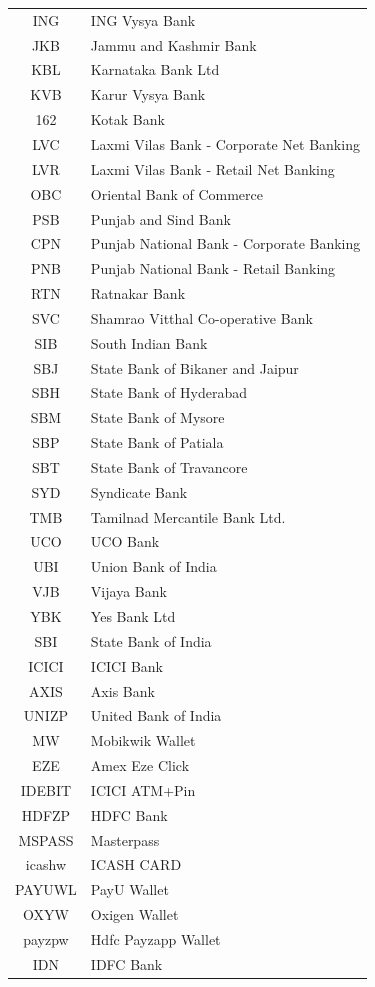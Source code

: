 \documentclass{article}
\begin{document}
\begin{longtable}{||c|p{12.5cm}||}
ING & ING Vysya Bank\\
JKB & Jammu and Kashmir Bank\\
KBL & Karnataka Bank Ltd\\
KVB & Karur Vysya Bank\\
162 & Kotak Bank\\
LVC & Laxmi Vilas Bank - Corporate Net Banking\\
LVR & Laxmi Vilas Bank - Retail Net Banking\\
OBC & Oriental Bank of Commerce\\
PSB & Punjab and Sind Bank\\
CPN & Punjab National Bank - Corporate Banking\\
PNB & Punjab National Bank - Retail Banking\\
RTN & Ratnakar Bank\\
SVC & Shamrao Vitthal Co-operative Bank\\
SIB & South Indian Bank\\
SBJ & State Bank of Bikaner and Jaipur\\
SBH & State Bank of Hyderabad\\
SBM & State Bank of Mysore\\
SBP & State Bank of Patiala\\
SBT & State Bank of Travancore\\
SYD & Syndicate Bank\\
TMB & Tamilnad Mercantile Bank Ltd.\\
UCO & UCO Bank\\
UBI & Union Bank of India\\
VJB & Vijaya Bank\\
YBK & Yes Bank Ltd\\
SBI & State Bank of India\\
ICICI & ICICI Bank\\
AXIS & Axis Bank\\
UNIZP & United Bank of India\\
MW & Mobikwik Wallet\\
EZE & Amex Eze Click\\
IDEBIT & ICICI ATM+Pin\\
HDFZP & HDFC Bank\\
MSPASS & Masterpass\\
icashw & ICASH CARD\\
PAYUWL & PayU Wallet\\
OXYW & Oxigen Wallet\\
payzpw & Hdfc Payzapp Wallet\\
IDN & IDFC Bank\\
\end{longtable}
\newpage
\end{document}
